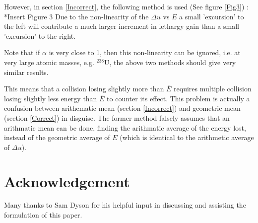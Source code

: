 \documentclass[a4paper, 12pt]{article}
\begin{document}
	
	However, in section \ref{Incorrect}, the following method is used (See figure \ref{Fig3}) :
	*Insert Figure 3
	Due to the non-linearity of the $\Delta u$ vs $E$ a small 'excursion' to the left will contribute a much larger increment in lethargy gain than a small 'excursion' to the right.
	
	Note that if $\alpha$ is very close to 1, then this non-linearity can be ignored, i.e. at very large atomic masses, e.g. ${}^{238}$U, the above two methods should give very similar results.

	This means that a collision losing slightly more than $\overline{E}$ requires multiple collision losing slightly less energy than $\overline{E}$ to counter its effect.
	This problem is actually a confusion between arithematic mean (section \ref{Incorrect}) and geometric mean (section \ref{Correct}) in disguise. The former method falsely assumes that an arithmatic mean can be done, finding the arithmatic average of the energy lost, instead of the geometric average of $E$ (which is identical to the arithmetic average of $\Delta u$).

\section{Acknowledgement}
	Many thanks to Sam Dyson for his helpful input in discussing and assisting the formulation of this paper.
\end{document}
